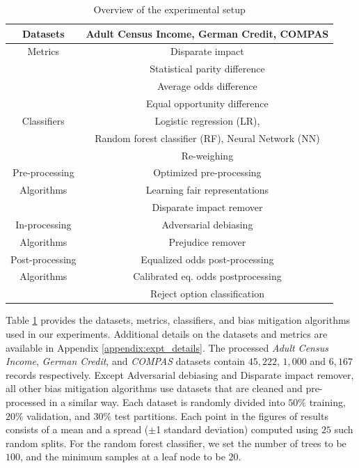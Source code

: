 \documentclass{article}
\begin{document}
 \begin{table} [h!]
 \begin{scriptsize}
     \caption{Overview of the experimental setup}
     \label{tab:evaluation}
     \centering
     \begin{tabular}{|c|c|}
     \hline
      Datasets & Adult Census Income, German Credit, COMPAS \\
      \hline
      Metrics & Disparate impact\\
              & Statistical parity difference \\
              & Average odds difference \\
              & Equal opportunity difference\\
     \hline
     Classifiers & Logistic regression (LR),\\
                 & Random forest classifier (RF), Neural Network (NN)\\
     \hline
       & Re-weighing \cite{KamiranCalders2012} \\
      Pre-processing & Optimized pre-processing \cite{CalmonWVRV2017} \\
       Algorithms & Learning fair representations \cite{zemel2013fairrepresentations}\\
                               & Disparate impact remover \cite{FeldmanFMSV2015} \\
     \hline
     In-processing & Adversarial debiasing \cite{ZhangLM2018} \\
     Algorithms   & Prejudice remover \cite{kamishima2012fairness} \\
     \hline
     Post-processing & Equalized odds post-processing \cite{hardt2016equality} \\
    Algorithms & Calibrated eq. odds postprocessing \cite{pleiss2017fairness}\\
    & Reject option classification \cite{Kamiran2012}\\
    \hline
     \end{tabular}
\end{scriptsize}
 \end{table}
 
Table \ref{tab:evaluation} provides the datasets, metrics, classifiers, and bias mitigation algorithms used in our experiments. Additional details on the datasets and metrics are available in Appendix \ref{appendix:expt_details}. The processed \textit{Adult Census Income}, \textit{German Credit}, and \textit{COMPAS} datasets contain $45{,}222$, $1{,}000$ and $6{,}167$ records respectively. Except Adversarial debiasing and Disparate impact remover, all other bias mitigation algorithms use datasets that are cleaned and pre-processed in a similar way. Each dataset is randomly divided into $50\%$ training, $20\%$ validation, and $30\%$ test partitions. Each point in the figures of results consists of a mean and a spread ($\pm$1  standard deviation) computed using $25$ such random splits. For the random forest classifier, we set the number of trees to be $100$, and the minimum samples at a leaf node to be $20$. 
\end{document}

